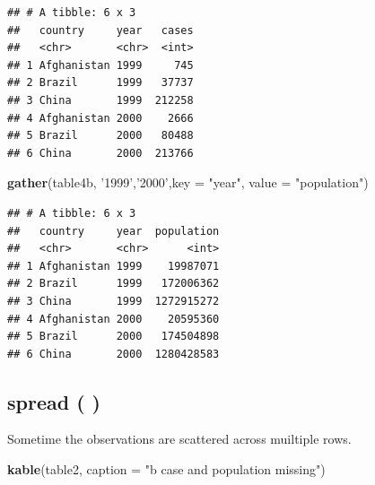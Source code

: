 \documentclass[]{book}
\newenvironment{Shaded}{\begin{snugshade}}{\end{snugshade}}
\newcommand{\KeywordTok}[1]{\textcolor[rgb]{0.13,0.29,0.53}{\textbf{#1}}}
\newcommand{\DataTypeTok}[1]{\textcolor[rgb]{0.13,0.29,0.53}{#1}}
\newcommand{\StringTok}[1]{\textcolor[rgb]{0.31,0.60,0.02}{#1}}
\newcommand{\NormalTok}[1]{#1}
\begin{document}
\begin{verbatim}
## # A tibble: 6 x 3
##   country     year   cases
##   <chr>       <chr>  <int>
## 1 Afghanistan 1999     745
## 2 Brazil      1999   37737
## 3 China       1999  212258
## 4 Afghanistan 2000    2666
## 5 Brazil      2000   80488
## 6 China       2000  213766
\end{verbatim}

\begin{Shaded}
\begin{Highlighting}[]
\KeywordTok{gather}\NormalTok{(table4b, }\StringTok{'1999'}\NormalTok{,}\StringTok{'2000'}\NormalTok{,}\DataTypeTok{key =} \StringTok{"year"}\NormalTok{, }\DataTypeTok{value =} \StringTok{"population"}\NormalTok{)}
\end{Highlighting}
\end{Shaded}

\begin{verbatim}
## # A tibble: 6 x 3
##   country     year  population
##   <chr>       <chr>      <int>
## 1 Afghanistan 1999    19987071
## 2 Brazil      1999   172006362
## 3 China       1999  1272915272
## 4 Afghanistan 2000    20595360
## 5 Brazil      2000   174504898
## 6 China       2000  1280428583
\end{verbatim}

\subsection{spread ( )}\label{spread}

Sometime the observations are scattered across muiltiple rows.

\begin{Shaded}
\begin{Highlighting}[]
\KeywordTok{kable}\NormalTok{(table2, }\DataTypeTok{caption =} \StringTok{"b case and population missing"}\NormalTok{)}
\end{Highlighting}
\end{Shaded}
\end{document}
